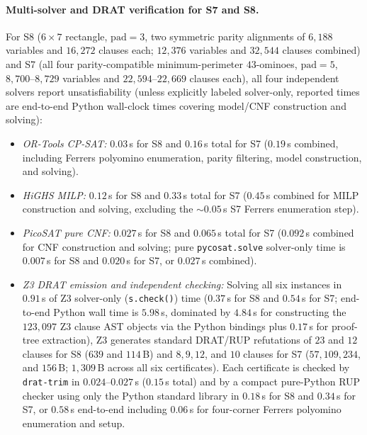 \documentclass[11pt]{article}
\begin{document}
\paragraph{Multi-solver and DRAT verification for S7 and S8.}
For S8 ($6 \times 7$ rectangle, $\mathrm{pad} = 3$, two symmetric parity alignments of $6{,}188$ variables and $16{,}272$ clauses each; $12{,}376$ variables and $32{,}544$ clauses combined) and S7 (all four parity-compatible minimum-perimeter $43$-ominoes, $\mathrm{pad} = 5$, $8{,}700$--$8{,}729$ variables and $22{,}594$--$22{,}669$ clauses each), all four independent solvers report unsatisfiability (unless explicitly labeled solver-only, reported times are end-to-end Python wall-clock times covering model/CNF construction and solving):
\begin{itemize}[leftmargin=*,topsep=2pt,itemsep=1pt]
\item \emph{OR-Tools CP-SAT:} $0.03\,$s for S8 and $0.16\,$s total for S7 ($0.19\,$s combined, including Ferrers polyomino enumeration, parity filtering, model construction, and solving).
\item \emph{HiGHS MILP:} $0.12\,$s for S8 and $0.33\,$s total for S7 ($0.45\,$s combined for MILP construction and solving, excluding the ${\sim}0.05\,$s S7 Ferrers enumeration step).
\item \emph{PicoSAT pure CNF:} $0.027\,$s for S8 and $0.065\,$s total for S7 ($0.092\,$s combined for CNF construction and solving; pure \texttt{pycosat.solve} solver-only time is $0.007\,$s for S8 and $0.020\,$s for S7, or $0.027\,$s combined).
\item \emph{Z3 DRAT emission and independent checking:} Solving all six instances in $0.91\,$s of Z3 solver-only (\texttt{s.check()}) time ($0.37\,$s for S8 and $0.54\,$s for S7; end-to-end Python wall time is $5.98\,$s, dominated by $4.84\,$s for constructing the $123{,}097$ Z3 clause AST objects via the Python bindings plus $0.17\,$s for proof-tree extraction), Z3 generates standard DRAT/RUP refutations of $23$ and $12$ clauses for S8 ($639$ and $114\,$B) and $8, 9, 12$, and $10$ clauses for S7 ($57, 109, 234$, and $156\,$B; $1{,}309\,$B across all six certificates). Each certificate is checked by \texttt{drat-trim} in $0.024$--$0.027\,$s ($0.15\,$s total) and by a compact pure-Python RUP checker using only the Python standard library in $0.18\,$s for S8 and $0.34\,$s for S7, or $0.58\,$s end-to-end including $0.06\,$s for four-corner Ferrers polyomino enumeration and setup.
\end{itemize}
\end{document}
